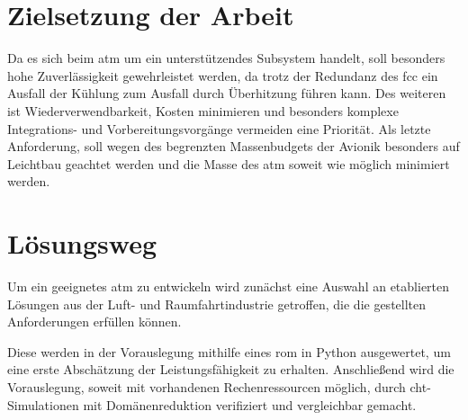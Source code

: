 \section{Zielsetzung der Arbeit}

Da es sich beim \ac{atm} um ein unterstützendes Subsystem handelt, soll besonders hohe Zuverlässigkeit gewehrleistet werden, da trotz der
Redundanz des \ac{fcc} ein Ausfall der Kühlung zum Ausfall durch Überhitzung führen kann.
Des weiteren ist Wiederverwendbarkeit, Kosten minimieren und besonders komplexe Integrations- und Vorbereitungsvorgänge
vermeiden eine Priorität.
Als letzte Anforderung, soll wegen des begrenzten Massenbudgets der Avionik
besonders auf Leichtbau geachtet werden und die Masse des \ac{atm} soweit wie möglich minimiert werden.

\section{Lösungsweg}

Um ein geeignetes \ac{atm} zu entwickeln wird zunächst eine Auswahl an etablierten Lösungen aus der Luft- und Raumfahrtindustrie
getroffen, die die gestellten Anforderungen erfüllen können.

Diese werden in der Vorauslegung mithilfe eines \ac{rom} in Python ausgewertet, um eine erste Abschätzung der Leistungsfähigkeit zu erhalten.
Anschließend wird die Vorauslegung, soweit mit vorhandenen Rechenressourcen möglich, durch \ac{cht}-Simulationen mit Domänenreduktion
verifiziert und vergleichbar gemacht.